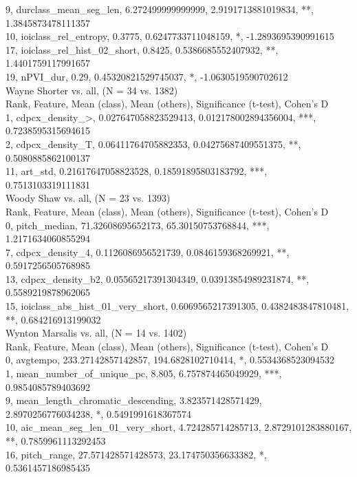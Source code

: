 9, durclass_mean_seg_len, 6.272499999999999, 2.9191713881019834, **, 1.3845873478111357\\
10, ioiclass_rel_entropy, 0.3775, 0.6247733711048159, *, -1.2893695390991615\\
17, ioiclass_rel_hist_02_short, 0.8425, 0.5386685552407932, **, 1.4401759117991657\\
19, nPVI_dur, 0.29, 0.45320821529745037, *, -1.0630519590702612\\
Wayne Shorter vs. all, (N = 34 vs. 1382)\\
Rank, Feature, Mean (class), Mean (others), Significance (t-test), Cohen's D\\
1, cdpcx_density_>, 0.027647058823529413, 0.012178002894356004, ***, 0.7238595315694615\\
2, cdpcx_density_T, 0.06411764705882353, 0.04275687409551375, **, 0.5080885862100137\\
11, art_std, 0.21617647058823528, 0.18591895803183792, ***, 0.7513103319111831\\
Woody Shaw vs. all, (N = 23 vs. 1393)\\
Rank, Feature, Mean (class), Mean (others), Significance (t-test), Cohen's D\\
0, pitch_median, 71.32608695652173, 65.30150753768844, ***, 1.2171634060855294\\
7, cdpcx_density_4, 0.1126086956521739, 0.0846159368269921, **, 0.5917256505768985\\
13, cdpcx_density_b2, 0.05565217391304349, 0.03913854989231874, **, 0.5589219878962065\\
15, ioiclass_abs_hist_01_very_short, 0.6069565217391305, 0.4382483847810481, **, 0.684216913199032\\
Wynton Marsalis vs. all, (N = 14 vs. 1402)\\
Rank, Feature, Mean (class), Mean (others), Significance (t-test), Cohen's D\\
0, avgtempo, 233.27142857142857, 194.6828102710414, *, 0.5534368523094532\\
1, mean_number_of_unique_pc, 8.805, 6.757874465049929, ***, 0.9854085789403692\\
9, mean_length_chromatic_descending, 3.823571428571429, 2.8970256776034238, *, 0.5491991618367574\\
10, aic_mean_seg_len_01_very_short, 4.724285714285713, 2.8729101283880167, **, 0.7859961113292453\\
16, pitch_range, 27.571428571428573, 23.174750356633382, *, 0.5361457186985435\\
